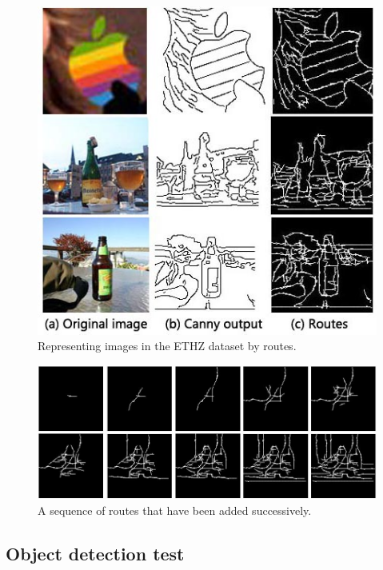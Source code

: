 \documentclass[journal]{IEEEtran}
\begin{document}
\begin{figure}[!t]
\centering
\includegraphics[width=0.7\linewidth]{images/fig19.jpg}
\caption{Representing images in the ETHZ dataset by routes.}
\label{fig:19}
\end{figure}

\begin{figure}[!t]
\centering
\includegraphics[width=0.8\linewidth]{images/fig20.jpg}
\caption{A sequence of routes that have been added successively.}
\label{fig:20}
\end{figure}

\subsection{Object detection test}
\end{document}
